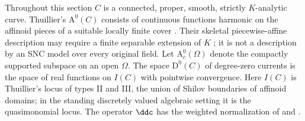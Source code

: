 Throughout this section $C$ is a connected, proper, smooth, strictly
$K$-analytic curve.  Thuillier's $\mathrm A^0(C)$ consists of continuous
functions harmonic on the affinoid pieces of a suitable locally finite
cover \cite[Definition~3.2.1]{Thu05}.  Their skeletal piecewise-affine
description may require a finite separable extension of $K$
\cite[Proposition~3.2.4]{Thu05}; it is not a description by an SNC model
over every original field.  Let $\mathrm A^0_c(\Omega)$ denote the
compactly supported subspace on an open $\Omega$.
The space $\mathrm D^0(C)$ of degree-zero currents is the space of real
functions on $I(C)$ with pointwise convergence.  Here $I(C)$ is Thuillier's
locus of types II and III, the union of Shilov boundaries of
affinoid domains; in the standing discretely valued algebraic setting it
is the quasimonomial locus.  The operator $\ddc$ has the weighted
normalization of  and
.

